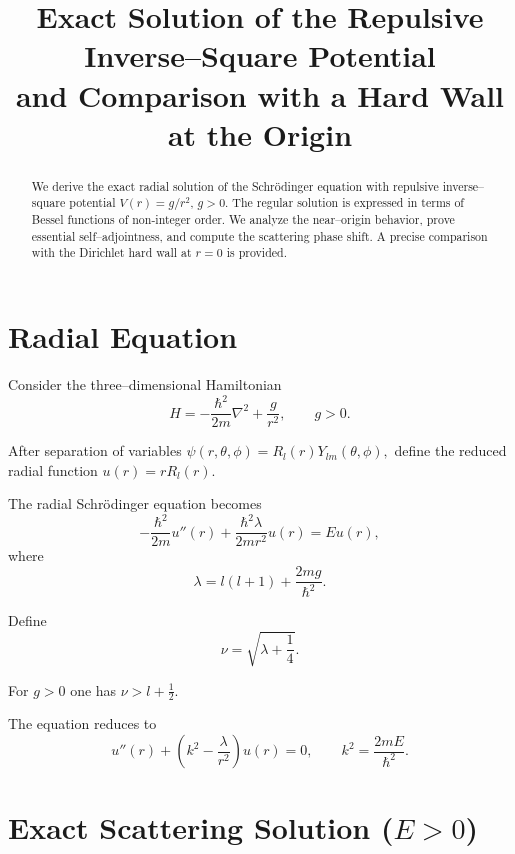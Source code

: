 \documentclass[11pt,a4paper]{article}
\title{\textbf{Exact Solution of the Repulsive Inverse--Square Potential\\
and Comparison with a Hard Wall at the Origin}}
\author{}
\date{}
\begin{document}
\maketitle

\begin{abstract}
We derive the exact radial solution of the Schrödinger equation
with repulsive inverse--square potential $V(r)=g/r^2$, $g>0$.
The regular solution is expressed in terms of Bessel functions
of non-integer order.
We analyze the near--origin behavior, prove essential self--adjointness,
and compute the scattering phase shift.
A precise comparison with the Dirichlet hard wall at $r=0$
is provided.
\end{abstract}

\section{Radial Equation}

Consider the three–dimensional Hamiltonian
\begin{equation}
H=-\frac{\hbar^2}{2m}\nabla^2+\frac{g}{r^2},
\qquad g>0.
\end{equation}

After separation of variables
\(
\psi(r,\theta,\phi)=R_l(r)Y_{lm}(\theta,\phi),
\)
define the reduced radial function
\(
u(r)=rR_l(r).
\)

The radial Schrödinger equation becomes
\begin{equation}
-\frac{\hbar^2}{2m}u''(r)
+
\frac{\hbar^2\lambda}{2m r^2}u(r)
=
Eu(r),
\end{equation}
where
\begin{equation}
\lambda
=
l(l+1)+\frac{2mg}{\hbar^2}.
\end{equation}

Define
\begin{equation}
\nu=\sqrt{\lambda+\frac{1}{4}}.
\end{equation}

For $g>0$ one has
\(
\nu>l+\tfrac{1}{2}.
\)

The equation reduces to
\begin{equation}
u''(r)+\left(k^2-\frac{\lambda}{r^2}\right)u(r)=0,
\qquad
k^2=\frac{2mE}{\hbar^2}.
\end{equation}

\section{Exact Scattering Solution ($E>0$)}
\end{document}
